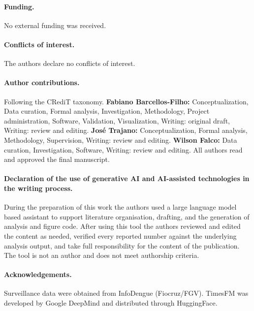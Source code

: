 \documentclass[11pt]{article}
\begin{document}
\paragraph{Funding.} No external funding was received.

\paragraph{Conflicts of interest.} The authors declare no conflicts of interest.

\paragraph{Author contributions.} Following the CRediT taxonomy.
\textbf{Fabiano Barcellos-Filho:} Conceptualization, Data curation, Formal analysis,
Investigation, Methodology, Project administration, Software, Validation, Visualization,
Writing: original draft, Writing: review and editing.
\textbf{Jos\'e Trajano:} Conceptualization, Formal analysis, Methodology, Supervision,
Writing: review and editing.
\textbf{Wilson Falco:} Data curation, Investigation, Software,
Writing: review and editing.
All authors read and approved the final manuscript.

\paragraph{Declaration of the use of generative AI and AI-assisted technologies in the
writing process.} During the preparation of this work the authors used a large language
model based assistant to support literature organisation, drafting, and the generation of
analysis and figure code. After using this tool the authors reviewed and edited the
content as needed, verified every reported number against the underlying analysis output,
and take full responsibility for the content of the publication. The tool is not an
author and does not meet authorship criteria.

\paragraph{Acknowledgements.} Surveillance data were obtained from InfoDengue
(Fiocruz/FGV). TimesFM was developed by Google DeepMind and distributed through
HuggingFace.



\end{document}

